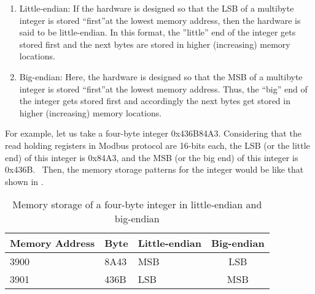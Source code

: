 \begin{enumerate}
  \item Little-endian:
        If the hardware is designed so that the LSB of a multibyte integer is stored ``first''at the lowest memory address, then the hardware is said to be little-endian. In this format, the ''little'' end of the integer gets stored
        first and the next bytes are stored in higher (increasing) memory
        locations.  
  \item Big-endian:
        Here, the hardware is designed so that the MSB of a multibyte integer is stored ``first''at the lowest memory address. Thus, the ``big'' end of the integer gets
        stored first and accordingly the next bytes get stored in higher
        (increasing) memory locations.  
\end{enumerate}
For example, let us take a four-byte integer 0x436B84A3. Considering 
that the read holding registers in Modbus protocol are 16-bits each, the 
LSB (or the little end) of this integer is 0x84A3, and the MSB (or the big end) 
of this integer is 0x436B.  Then, the memory storage patterns
for the integer would be like that shown in .
\begin{table}
  \centering
  \caption{Memory storage of a four-byte integer in little-endian and big-endian}
  \label{tab:memory-storage}
  \begin{tabular}{lllc}\hline
    Memory Address & Byte & Little-endian & Big-endian \\ \hline
    3900           & 8A43 & MSB           & LSB        \\
    3901           & 436B & LSB           & MSB        \\ 
    \hline
  \end{tabular}
\end{table}




